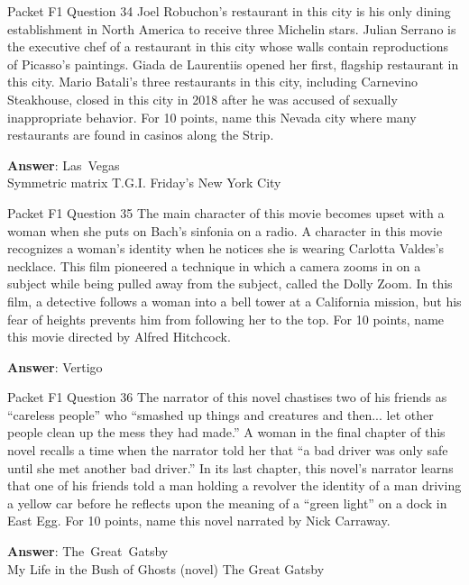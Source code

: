 \begin{frame}{Packet F1 Question 34}
Joel   Robuchon’s restaurant in this city is his only dining establishment   in North America to receive three Michelin stars. Julian Serrano is the executive chef of a restaurant in this city whose walls contain reproductions of Picasso’s paintings. Giada de Laurentiis opened her first, flagship restaurant in this city. Mario Batali’s three restaurants in this city, including Carnevino Steakhouse, closed in this city in 2018 after he was accused of sexually inappropriate behavior. For 10 points, name this Nevada city where   many restaurants are found in casinos along the Strip.  

\textbf{Answer}: Las\ Vegas\\
 Symmetric matrix
 T.G.I. Friday's
 New York City
\end{frame}

\begin{frame}{Packet F1 Question 35}
The main character of this movie becomes upset with a woman when she puts on Bach’s sinfonia on a radio. A character in this movie recognizes a woman’s identity when he notices she is wearing Carlotta Valdes’s necklace. This film pioneered a technique in which a camera zooms in on   a subject while being pulled away from the subject, called the Dolly Zoom. In this   film, a detective follows a woman into a bell tower at a   California mission, but his fear of heights prevents him from   following her to the top. For 10 points, name this movie directed by Alfred Hitchcock.

\textbf{Answer}: Vertigo\\
\end{frame}

\begin{frame}{Packet F1 Question 36}
The narrator of this novel chastises two of his friends as “careless people” who “smashed up things and creatures and then... let other people clean up the mess they had made.” A woman in the final chapter of this novel recalls a time when the narrator told her that “a bad driver was only safe until she met another bad driver.” In its last chapter, this novel’s narrator learns that one of his friends told a man holding a revolver the identity of a man driving a yellow car before he reflects upon the meaning of a “green light” on a dock     in East Egg. For 10 points, name this novel   narrated by Nick Carraway.  

\textbf{Answer}: The\ Great\ Gatsby\\
 My Life in the Bush of Ghosts (novel)
 The Great Gatsby
\end{frame}

